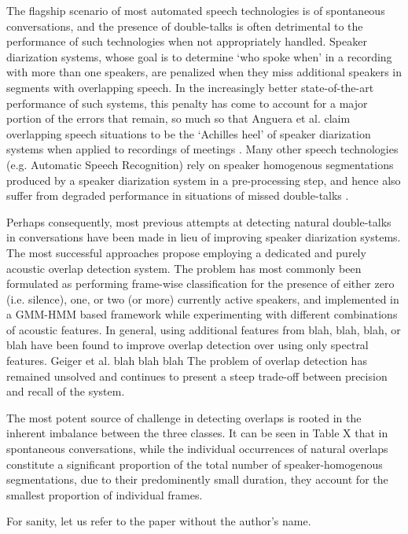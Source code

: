 \documentclass[a4paper]{article}
\begin{document}
The flagship scenario of most automated speech technologies is of spontaneous conversations,
and the presence of double-talks is often detrimental to the performance of such technologies when not appropriately handled.
Speaker diarization systems, whose goal is to determine `who spoke when' in a recording with more than one speakers,
are penalized when they miss additional speakers in segments with overlapping speech.
In the increasingly better state-of-the-art performance of such systems,
this penalty has come to account for a major portion of the errors that remain,
so much so that Anguera et al. claim overlapping speech situations to be the `Achilles heel' of speaker diarization systems when applied to recordings of meetings \cite{anguera_speaker_2012}.
Many other speech technologies (e.g. Automatic Speech Recognition) rely on speaker homogenous segmentations produced by a speaker diarization system in a pre-processing step,
and hence also suffer from degraded performance in situations of missed double-talks \cite{cetin_speaker_2006}.

Perhaps consequently, most previous attempts at detecting natural double-talks in conversations have been made in lieu of improving speaker diarization systems.
The most successful approaches propose employing a dedicated and purely acoustic overlap detection system.
The problem has most commonly been formulated as performing frame-wise classification for the presence of either zero (i.e. silence), one, or two (or more) currently active speakers,
and implemented in a GMM-HMM based framework while experimenting with different combinations of acoustic features.  %
In general, using additional features from blah, blah, blah, or blah %
have been found to improve overlap detection over using only spectral features.
Geiger et al. blah blah blah  %
The problem of overlap detection has remained unsolved
and continues to present a steep trade-off between precision and recall of the system.

The most potent source of challenge in detecting overlaps is rooted in the inherent imbalance between the three classes.
It can be seen in Table X that in spontaneous conversations,  %
while the individual occurrences of natural overlaps constitute a significant proportion of the total number of speaker-homogenous segmentations,
due to their predominently small duration, they account for the smallest proportion of individual frames.


For sanity, let us refer to the paper \cite{rabiner_tutorial_1989} without the author's name.



\end{document}
